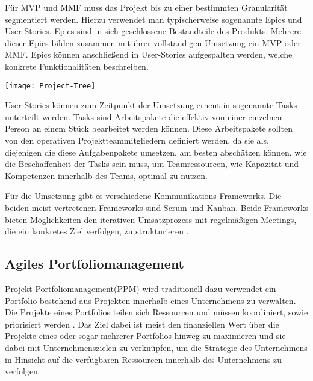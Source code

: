 Für MVP und MMF muss das Projekt bis zu einer bestimmten Granularität segmentiert werden. Hierzu verwendet man typischerweise sogenannte Epics und User-Stories. Epics sind in sich geschlossene Bestandteile des Produkts. Mehrere dieser Epics bilden zusammen mit ihrer vollständigen Umsetzung ein MVP oder MMF. Epics können anschließend in User-Stories aufgespalten werden, welche konkrete Funktionalitäten beschreiben. \cite{agilesProjektmanagementImBerufsalltagEpicsUndUserStories}

\vspace{20pt}
\begin{center}
    \begin{minipage}{0.8\linewidth}
        \texttt{[image: Project-Tree]}
    \end{minipage}
\end{center}
\vspace{20pt}

User-Stories können zum Zeitpunkt der Umsetzung erneut in sogenannte Tasks unterteilt werden. Tasks sind Arbeitspakete die effektiv von einer einzelnen Person an einem Stück bearbeitet werden können. Diese Arbeitspakete sollten von den operativen Projektteammitgliedern definiert werden, da sie als, diejenigen die diese Aufgabenpakete umsetzen, am besten abschätzen können, wie die Beschaffenheit der Tasks sein muss, um Teamressourcen, wie Kapazität und Kompetenzen innerhalb des Teams, optimal zu nutzen. \cite{agilesProjektmanagementImBerufsalltagEpicsUndUserStories}

Für die Umsetzung gibt es verschiedene Kommunikations-Frameworks. Die beiden meist vertretenen Frameworks sind Scrum und Kanban. Beide Frameworks bieten Möglichkeiten den iterativen Umsatzprozess mit regelmäßigen Meetings, die ein konkretes Ziel verfolgen, zu strukturieren \cite{}.

\subsection{Agiles Portfoliomanagement}
Projekt Portfoliomanagement(PPM) wird traditionell dazu verwendet ein Portfolio bestehend aus Projekten innerhalb eines Unternehmens zu verwalten. Die Projekte eines Portfolios teilen sich Ressourcen und müssen koordiniert, sowie priorisiert werden \cite{NGUYEN20181054}.
Das Ziel dabei ist meist den finanziellen Wert über die Projekte eines oder sogar mehrerer Portfolios hinweg zu maximieren und sie dabei mit Unternehmenszielen zu verknüpfen, um die Strategie des Unternehmens in Hinsicht auf die verfügbaren Ressourcen innerhalb des Unternehmens zu verfolgen \cite{MARTINSUO200756}.

